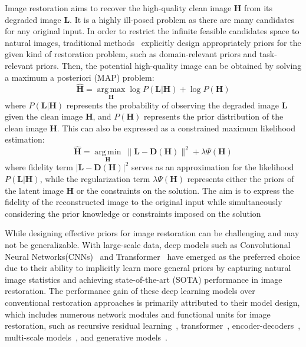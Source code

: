 \documentclass[sn-mathphys,Numbered]{sn-jnl}
\theoremstyle{thmstyleone}\newtheorem{theorem}{Theorem}\newtheorem{proposition}[theorem]{Proposition}
\theoremstyle{thmstyletwo}\newtheorem{example}{Example}\newtheorem{remark}{Remark}
\theoremstyle{thmstylethree}\newtheorem{definition}{Definition}
\begin{document}
Image restoration  aims to recover the high-quality clean image $\mathbf{H}$ from its degraded image $\mathbf{L}$. It is a highly ill-posed problem as there are many candidates for any original input. In order to restrict the infinite feasible candidates space to natural images, traditional methods~\cite{1992Nonlinear, 1997Prior, 2002Scale, 2005Fields, 2010Single, 2011Image, 2011Single} explicitly design appropriately priors for the given kind of restoration problem, such as domain-relevant priors and task-relevant priors. Then, the potential high-quality image can be obtained by solving a maximum a posteriori (MAP) problem:
\begin{equation}
	\label{equ:02}
	\mathbf{\hat{H}}= \underset {\mathbf{H}} { \operatorname {arg\,max}} \log P(\mathbf{L}|\mathbf{H}) + \log P(\mathbf{H})
\end{equation}
where $P(\mathbf{L}|\mathbf{H})$ represents the probability of observing the degraded image $\mathbf{L}$ given the clean image $\mathbf{H}$, and $P(\mathbf{H})$ represents the prior distribution of the clean image $\mathbf{H}$. This can also be expressed as a constrained maximum likelihood estimation:
\begin{equation}
	\label{equ:021}
	\mathbf{\hat{H}}= \underset {\mathbf{H}} { \operatorname {arg\,min}} \ \| \mathbf{L}-\mathbf{D(H)} \|^2 + \lambda\Psi(\mathbf{H})
\end{equation}
where fidelity term $| \mathbf{L}-\mathbf{D(H)} |^2$ serves as an approximation for the likelihood $P(\mathbf{L}|\mathbf{H})$, while the regularization term $\lambda\Psi(\mathbf{H})$ represents either the priors of the latent image $\mathbf{H}$ or the constraints on the solution. The aim is to express the fidelity of the reconstructed image to the original input while simultaneously considering the prior knowledge or constraints imposed on the solution

While designing effective priors for image restoration can be challenging and may not be generalizable.  With large-scale data, deep models such as Convolutional Neural Networks(CNNs)~\cite{Zamir2021MPRNet, Chen_2021_CVPR,PREnet,RESCAN,chen2022simple,chu2022nafssr, 2022Learning} and Transformer~\cite{zhang2023accurate, Zamir2021Restormer, Tsai2022Stripformer,Wang_2022_CVPR} have emerged as the preferred choice due to their ability to implicitly learn more general priors by capturing natural image statistics and achieving state-of-the-art (SOTA) performance in image restoration. The performance gain of these deep learning models over conventional restoration approaches is primarily attributed to their model design, which includes numerous network modules and functional units for image restoration, such as recursive residual learning~\cite{Wang2018ESRGANES}, transformer~\cite{Zamir2021Restormer, zhang2023accurate, Wang_2022_CVPR}, encoder-decoders~\cite{RFB15a,chen2022simple,chu2022nafssr}, multi-scale models~\cite{Mssnet,9156921}, and generative models~\cite{Degan,DBGAN,deganv2}.
\end{document}
